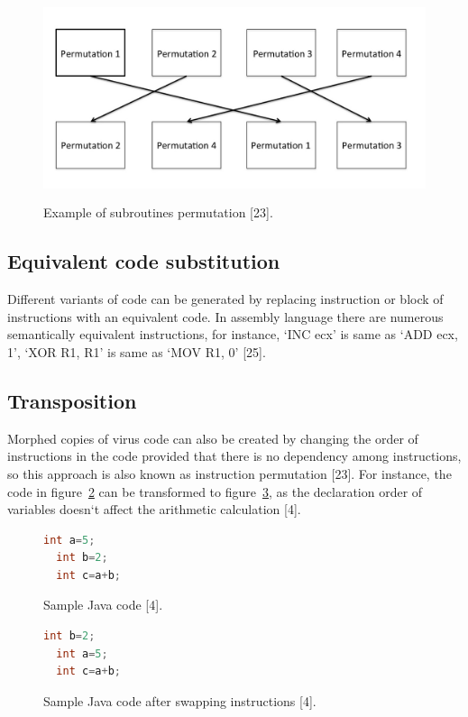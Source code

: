 \begin{figure}
  \centering
      \includegraphics[width=12cm, height=6cm]{subpermutation.jpg}
    \caption[Example of subroutines permutation]{Example of subroutines permutation [23].}
    \label{fig:subpermutation}
\end{figure}

\subsection{Equivalent code substitution} 
Different variants of code can be generated by replacing instruction or block of instructions with an equivalent code. In assembly language there are numerous semantically equivalent instructions, for instance, `INC ecx' is same as `ADD ecx, 1', `XOR R1, R1' is same as `MOV R1, 0' [25].

\subsection{Transposition} 
Morphed copies of virus code can also be created by changing the order of instructions in the code provided that there is no dependency among instructions, so this approach is also known as instruction permutation [23]. For instance, the code in figure~\ref{fig:beforetrans} can be transformed to figure~\ref{fig:aftertrans}, as the declaration order of variables doesn`t affect the arithmetic calculation [4]. 

\begin{figure}
  \centering
  \begin{lstlisting}[language=Java]
  int a=5;
  int b=2;
  int c=a+b;
\end{lstlisting}
    \caption[Sample Java code]{Sample Java code [4].}
    \label{fig:beforetrans}
\end{figure}

\begin{figure}
  \centering
  \begin{lstlisting}[language=Java]
  int b=2;
  int a=5;
  int c=a+b;
\end{lstlisting}
    \caption[Sample Java code after applying Transposition]{Sample Java code after swapping instructions  [4].}
    \label{fig:aftertrans}
\end{figure}

